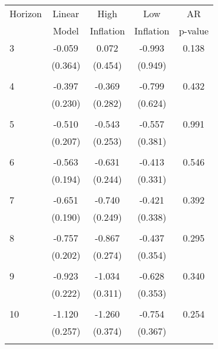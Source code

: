 \begin{tabular}{l*{1}{cccc}}
\hline\hline
 Horizon  & Linear & High                 & Low           & AR            \\
                  & Model         & Inflation & Inflation & p-value       \\
\hline
   3       & -0.059 & 0.072 & -0.993 & 0.138 \\
          & (0.364) & (0.454) & (0.949) & \\
 & & & &\\
   4       & -0.397 & -0.369 & -0.799 & 0.432 \\
          & (0.230) & (0.282) & (0.624) & \\
 & & & &\\
   5       & -0.510 & -0.543 & -0.557 & 0.991 \\
          & (0.207) & (0.253) & (0.381) & \\
 & & & &\\
   6       & -0.563 & -0.631 & -0.413 & 0.546 \\
          & (0.194) & (0.244) & (0.331) & \\
 & & & &\\
   7       & -0.651 & -0.740 & -0.421 & 0.392 \\
          & (0.190) & (0.249) & (0.338) & \\
 & & & &\\
   8       & -0.757 & -0.867 & -0.437 & 0.295 \\
          & (0.202) & (0.274) & (0.354) & \\
 & & & &\\
   9       & -0.923 & -1.034 & -0.628 & 0.340 \\
          & (0.222) & (0.311) & (0.353) & \\
 & & & &\\
  10       & -1.120 & -1.260 & -0.754 & 0.254 \\
          & (0.257) & (0.374) & (0.367) & \\
 & & & &\\
\hline\hline
\end{tabular}
